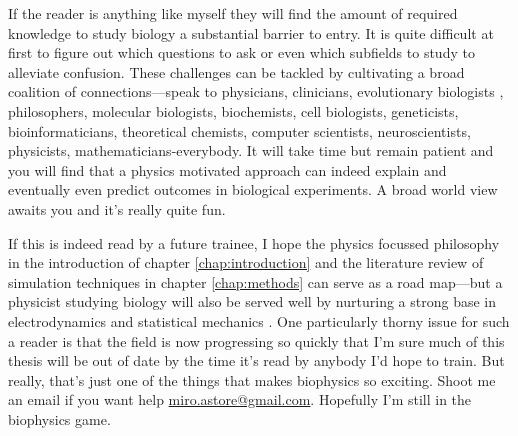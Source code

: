 
If the reader is anything like myself they will find the amount of required knowledge to study biology a substantial barrier to entry. It is quite difficult at first to figure out which questions to ask or even which subfields to study to alleviate confusion. These challenges can be tackled by cultivating a broad coalition of connections---speak to physicians, clinicians, evolutionary biologists \cite{dawkins1989, dawkins2016}, philosophers, molecular biologists, biochemists, cell biologists\cite{pollard2016}, geneticists, bioinformaticians, theoretical chemists, computer scientists, neuroscientists, physicists, mathematicians-everybody. It will take time but remain patient and you will find that a physics motivated approach can indeed explain and eventually even predict outcomes in biological experiments. A broad world view awaits you and it's really quite fun. 


If this is indeed read by a future trainee, I hope the physics focussed philosophy in the introduction of chapter \ref{chap:introduction} and the literature review of simulation techniques in chapter \ref{chap:methods} can serve as a road map---but a physicist studying biology will also be served well by nurturing a strong base in electrodynamics and statistical mechanics \cite{griffiths2017, reif2009, zuckerman2010}. One particularly thorny issue for such a reader is that the field is now progressing so quickly that I'm sure much of this thesis will be out of date by the time it's read by anybody I'd hope to train. But really, that's just one of the things that makes biophysics so exciting. Shoot me an email if you want help \href{mailto:miro.astore@gmailcom}{miro.astore@gmail.com}. Hopefully I'm still in the biophysics game.


